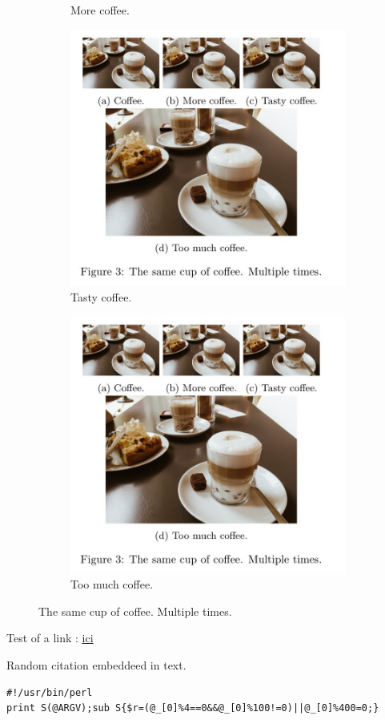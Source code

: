\documentclass{article}
\begin{document}
\begin{figure}[h!]
\begin{subfigure}[b]{0.2\linewidth}
    \caption{More coffee.}
  \end{subfigure}
  \begin{subfigure}[b]{0.2\linewidth}
    \includegraphics[width=\linewidth]{coffee.jpg}
    \caption{Tasty coffee.}
  \end{subfigure}
  \begin{subfigure}[b]{0.5\linewidth}
    \includegraphics[width=\linewidth]{coffee.jpg}
    \caption{Too much coffee.}
  \end{subfigure}
  \caption{The same cup of coffee. Multiple times.}
  \label{fig:coffee3}
 
\end{figure}

Test of a link : \href{http://www.atec.com}{ici}

Random citation \cite{WEBSITE:1} embeddeed in text.

\begin{lstlisting}
#!/usr/bin/perl
print S(@ARGV);sub S{$r=(@_[0]%4==0&&@_[0]%100!=0)||@_[0]%400=0;}
\end{lstlisting}

\newpage



\end{document}
